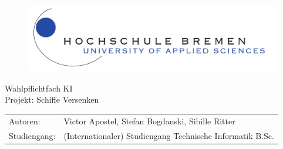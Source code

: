 %
%
%
%
%
\begin{titlepage}
	\begin{figure}[lt] %
		\includegraphics[scale=0.5]{images/logo_a4.pdf}
	\end{figure}
	\begin{center}
		\Huge
		Wahlpflichtfach KI\\
		\vspace{1cm}
		\Large
		Projekt: Schiffe Versenken
	\end{center}	
	\vfill
	\begin{table}[H] %
		\centering
		\begin{tabular}{ll}
			Autoren: & Victor Apostel, Stefan Bogdanski, Sibille Ritter \\
			Studiengang: & (Internationaler) Studiengang Technische Informatik B.Sc. \\
		\end{tabular}
		\label{label}
	\end{table}
\end{titlepage}